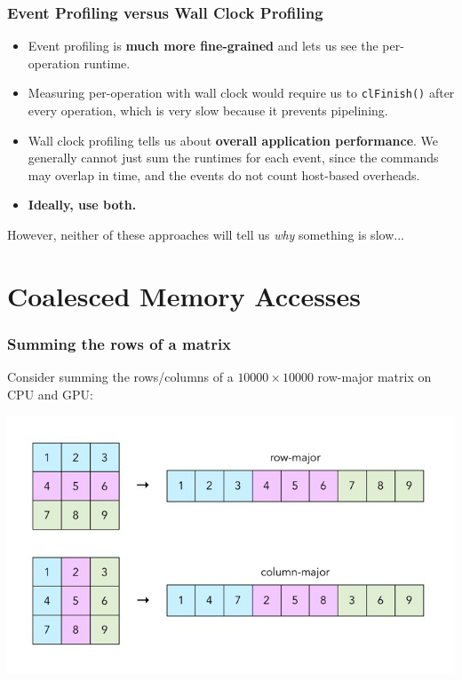 \documentclass{beamer}
\begin{document}
\begin{frame}
  \frametitle{Event Profiling versus Wall Clock Profiling}

  \begin{itemize}
  \item Event profiling is \textbf{much more fine-grained} and lets us
    see the per-operation runtime.
  \item Measuring per-operation with wall clock would require us to
    \texttt{clFinish()} after every operation, which is very slow
    because it prevents pipelining.
  \item Wall clock profiling tells us about \textbf{overall
      application performance}.  We generally cannot just sum the
    runtimes for each event, since the commands may overlap in time,
    and the events do not count host-based overheads.
  \item \textbf{Ideally, use both.}
  \end{itemize}

  However, neither of these approaches will tell us \textit{why}
  something is slow...
\end{frame}

\section{Coalesced Memory Accesses}

\begin{frame}
	\tableofcontents[currentsection]
\end{frame}

\begin{frame}[fragile]
  \frametitle{Summing the rows of a matrix}

  Consider summing the rows/columns of a $10000\times{}10000$
  row-major matrix on CPU and GPU:

  \includegraphics[width=\textwidth]{img/rowcolumnarrays.jpg}

\end{frame}
\end{document}
